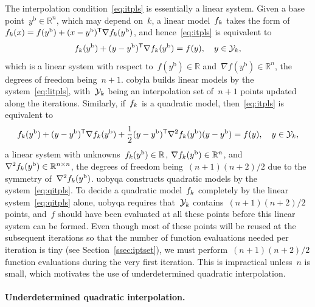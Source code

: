 \documentclass[
    smallextended,  %
    final,        %
]{svjour3}
\newcommand{\R}{\mathbb{R}}
\newcommand{\T}{\mathsf{T}}
\newcommand{\base}{{\text{b}}}
\newcommand{\objm}[1][k]{\obj\ifthenelse{\equal{#1}{}}{}{_{#1}}}
\newcommand{\obj}{f}
\newcommand{\xpt}[1][k]{\mathcal{Y}\ifthenelse{\equal{#1}{}}{}{_{#1}}}
\begin{document}
The interpolation condition~\eqref{eq:itpls} is essentially a linear system.
Given a base point~$y^{\base}\in \R^n$, which may depend on~$k$, a linear model~$\objm$ takes the
form of~$\objm(x) = \obj(y^{\base}) + (x - y^{\base})^{\T} \nabla \objm(y^{\base})$, and
hence~\eqref{eq:itpls} is equivalent to
\begin{equation}
    \label{eq:litpls}
    \objm(y^{\base}) + (y -y^{\base})^{\T} \nabla \objm(y^{\base})  = \obj(y),  \quad y \in \xpt,
\end{equation}
which is a linear system with respect to~$\obj(y^\base) \in \R$ and~$\nabla \obj(y^\base) \in \R^n$, the degrees of freedom being~$n+1$.
\Gls{cobyla} builds linear models by the system~\eqref{eq:litpls}, with~$\xpt$ being an interpolation
set of~$n+1$ points updated along the iterations.
Similarly, if~$\objm$ is a quadratic model, then~\eqref{eq:itpls} is equivalent to
\begin{equation}
    \label{eq:qitpls}
    \objm(y^{\base}) + (y -y^{\base})^{\T} \nabla \objm(y^{\base})
    + \frac{1}{2}(y-y^{\base})^{\T}  \nabla^2 \objm(y^{\base}) (y-y^{\base}) = \obj(y),  \quad y \in \xpt,
\end{equation}
a linear system with unknowns~$\objm(y^\base) \in \R$, $\nabla \objm(y^\base) \in \R^n$, and~$\nabla^2 \objm(y^{\base})\in\R^{n \times n}$, the degrees of freedom being~$(n + 1)(n + 2) / 2$ due to the symmetry of~$\nabla^2 \objm(y^\base)$.
\Gls{uobyqa} constructs quadratic models by the system~\eqref{eq:qitpls}.
To decide a quadratic model~$\objm$ completely by the linear system~\eqref{eq:qitpls} alone,
\gls{uobyqa} requires that~$\xpt$ contains~$(n+1)(n+2)/2$ points, and~$f$ should have been evaluated at all these points before this linear system can be formed.
Even though most of these points will be reused at the subsequent iterations so that the number of
function evaluations needed per iteration is tiny (see Section~\ref{ssec:iptset}), we must perform~$(n + 1)(n + 2) / 2$ function evaluations during the very first iteration.
This is impractical unless~$n$ is small, which motivates the use of underdetermined quadratic interpolation.

\paragraph{\textnormal{\textbf{Underdetermined quadratic interpolation.}}}
\end{document}
